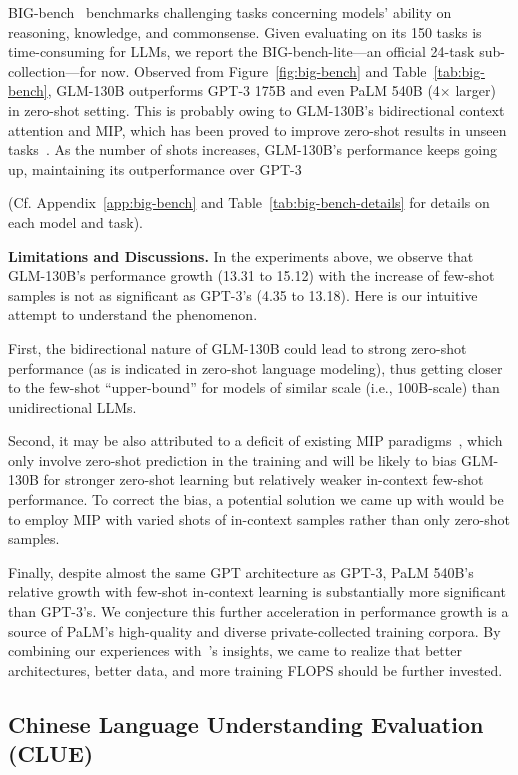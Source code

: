 BIG-bench~\citep{srivastava2022beyond} benchmarks challenging tasks concerning models' ability on reasoning, knowledge, and commonsense. Given evaluating on its 150 tasks is time-consuming for LLMs, we report the BIG-bench-lite---an official 24-task sub-collection---for now. Observed from Figure~\ref{fig:big-bench} and Table~\ref{tab:big-bench}, 
GLM-130B outperforms GPT-3 175B and even PaLM 540B (4$\times$ larger) in zero-shot setting. This is probably owing to GLM-130B's bidirectional context attention and MIP, which has been proved to improve zero-shot results in unseen tasks~\citep{wei2022finetuned,sanh2022multitask}. As the number of shots increases, GLM-130B's performance keeps going up, maintaining its outperformance over GPT-3  

(Cf. Appendix~\ref{app:big-bench} and Table~\ref{tab:big-bench-details} for details on each model and task).

\textbf{Limitations and Discussions.} In the experiments above, we observe that GLM-130B's performance growth (13.31 to 15.12) with the increase of few-shot samples is not as significant as GPT-3's (4.35 to 13.18). Here is our intuitive attempt to understand the phenomenon. 

First, the bidirectional nature of GLM-130B could lead to strong zero-shot performance (as is indicated in zero-shot language modeling), thus getting closer to the few-shot ``upper-bound'' for models of similar scale (i.e., 100B-scale) than unidirectional LLMs.

Second, it may be also attributed to a deficit of existing MIP paradigms~\citep{wei2022finetuned,sanh2022multitask}, which only involve zero-shot prediction in the training and will be likely to bias GLM-130B for stronger zero-shot learning but relatively weaker in-context few-shot performance. To correct the bias, a potential solution we came up with would be to employ MIP with varied shots of in-context samples rather than only zero-shot samples.

Finally, despite almost the same GPT architecture as GPT-3, PaLM 540B's relative growth with few-shot in-context learning is substantially more significant than GPT-3's. We conjecture this further acceleration in performance growth is a source of PaLM's high-quality and diverse private-collected training corpora. By combining our experiences with~\citep{hoffmann2022training}'s insights, we came to realize that better architectures, better data, and more training FLOPS should be further invested. 

\subsection{Chinese Language Understanding Evaluation (CLUE)} \label{sec:clue}

